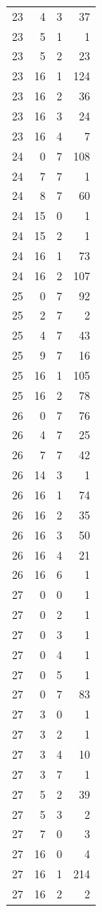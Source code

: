 \begin{longtable}{rrrr}
23 & 4 & 3 & 37\\
23 & 5 & 1 & 1\\
23 & 5 & 2 & 23\\
23 & 16 & 1 & 124\\
23 & 16 & 2 & 36\\
23 & 16 & 3 & 24\\
23 & 16 & 4 & 7\\
24 & 0 & 7 & 108\\
24 & 7 & 7 & 1\\
24 & 8 & 7 & 60\\
24 & 15 & 0 & 1\\
24 & 15 & 2 & 1\\
24 & 16 & 1 & 73\\
24 & 16 & 2 & 107\\
25 & 0 & 7 & 92\\
25 & 2 & 7 & 2\\
25 & 4 & 7 & 43\\
25 & 9 & 7 & 16\\
25 & 16 & 1 & 105\\
25 & 16 & 2 & 78\\
26 & 0 & 7 & 76\\
26 & 4 & 7 & 25\\
26 & 7 & 7 & 42\\
26 & 14 & 3 & 1\\
26 & 16 & 1 & 74\\
26 & 16 & 2 & 35\\
26 & 16 & 3 & 50\\
26 & 16 & 4 & 21\\
26 & 16 & 6 & 1\\
27 & 0 & 0 & 1\\
27 & 0 & 2 & 1\\
27 & 0 & 3 & 1\\
27 & 0 & 4 & 1\\
27 & 0 & 5 & 1\\
27 & 0 & 7 & 83\\
27 & 3 & 0 & 1\\
27 & 3 & 2 & 1\\
27 & 3 & 4 & 10\\
27 & 3 & 7 & 1\\
27 & 5 & 2 & 39\\
27 & 5 & 3 & 2\\
27 & 7 & 0 & 3\\
27 & 16 & 0 & 4\\
27 & 16 & 1 & 214\\
27 & 16 & 2 & 2\\

\end{longtable}
